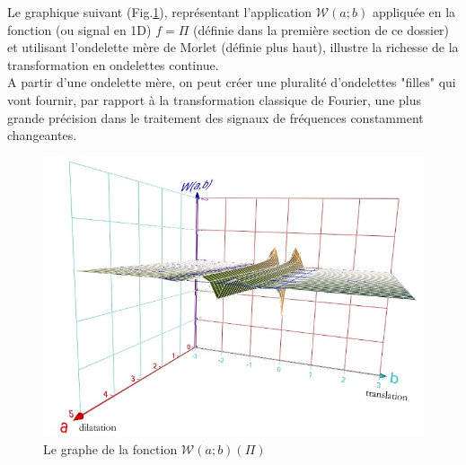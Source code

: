 
Le graphique suivant (Fig.\ref{graph3D}), représentant l'application $\mathcal{W}(a;b)$ appliquée en la fonction (ou signal en 1D) $f=\Pi$ (définie dans la première section de ce dossier) et utilisant l'ondelette mère de Morlet (définie plus haut), illustre la richesse de la transformation en ondelettes continue. \\
A partir d'une ondelette mère, on peut créer une pluralité d'ondelettes "filles" qui vont fournir, par rapport à la transformation classique de Fourier, une plus grande précision dans le traitement des signaux de fréquences constamment changeantes.

\begin{figure}[H]
\centering
\includegraphics[scale=0.6]{images/graphe3D.jpg}
\caption{Le graphe de la fonction $\mathcal{W}(a;b)(\Pi)$}
\label{graph3D}
\end{figure}

